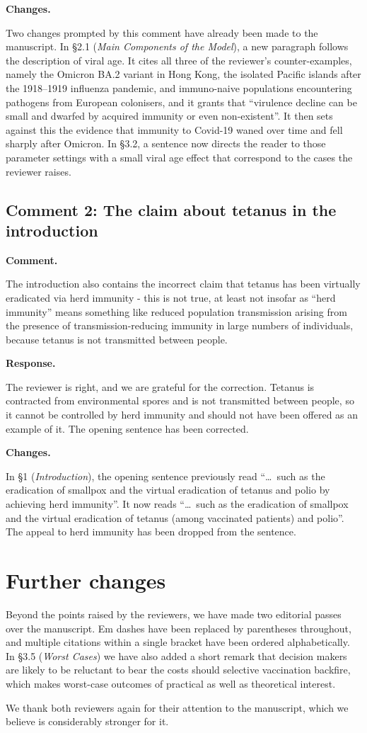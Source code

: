 \documentclass[a4paper,12pt]{article}
\newcommand{\reply}[1]{#1}
\newcommand{\rlabel}[1]{\par\medskip\noindent\textbf{#1}\par\nobreak}
\begin{document}
\rlabel{Changes.}
\reply{Two changes prompted by this comment have already been made to the
manuscript. In \S2.1 (\emph{Main Components of the Model}), a new paragraph
follows the description of viral age. It cites all three of the reviewer's
counter-examples, namely the Omicron BA.2 variant in Hong Kong, the isolated
Pacific islands after the 1918--1919 influenza pandemic, and immuno-naive
populations encountering pathogens from European colonisers, and it grants that
``virulence decline can be small and dwarfed by acquired immunity or even
non-existent''. It then sets against this the evidence that immunity to
Covid-19 waned over time and fell sharply after Omicron. In \S3.2, a sentence
now directs the reader to those parameter settings with a small viral age
effect that correspond to the cases the reviewer raises.}

\subsection*{Comment 2: The claim about tetanus in the introduction}

\rlabel{Comment.}
The introduction also contains the incorrect claim that tetanus has been virtually eradicated via herd immunity - this is not true, at least not insofar as ``herd immunity'' means something like reduced population transmission arising from the presence of transmission-reducing immunity in large numbers of individuals, because tetanus is not transmitted between people.

\rlabel{Response.}
\reply{The reviewer is right, and we are grateful for the correction. Tetanus
is contracted from environmental spores and is not transmitted between people,
so it cannot be controlled by herd immunity and should not have been offered as
an example of it. The opening sentence has been corrected.}

\rlabel{Changes.}
\reply{In \S1 (\emph{Introduction}), the opening sentence previously read
``\dots\ such as the eradication of smallpox and the virtual eradication of
tetanus and polio by achieving herd immunity''. It now reads ``\dots\ such as
the eradication of smallpox and the virtual eradication of tetanus (among
vaccinated patients) and polio''. The appeal to herd immunity has been dropped
from the sentence.}

\bigskip

\section*{Further changes}

\noindent\reply{Beyond the points raised by the reviewers, we have made two
editorial passes over the manuscript. Em dashes have been replaced by
parentheses throughout, and multiple citations within a single bracket have
been ordered alphabetically. In \S3.5 (\emph{Worst Cases}) we have also added a
short remark that decision makers are likely to be reluctant to bear the costs
should selective vaccination backfire, which makes worst-case outcomes of
practical as well as theoretical interest.}

\bigskip

\noindent\reply{We thank both reviewers again for their attention to the
manuscript, which we believe is considerably stronger for it.}
\end{document}
